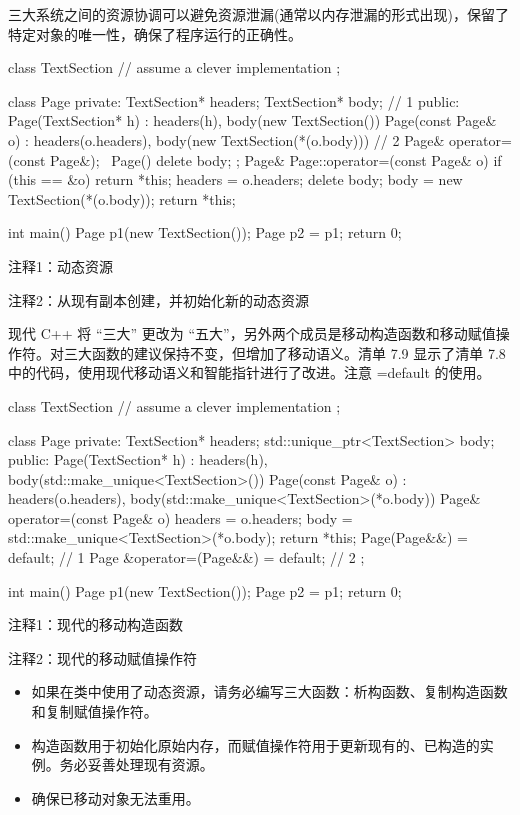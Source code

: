 三大系统之间的资源协调可以避免资源泄漏(通常以内存泄漏的形式出现)，保留了特定对象的唯一性，确保了程序运行的正确性。


\begin{cpp}
class TextSection {
  // assume a clever implementation
};

class Page {
private:
  TextSection* headers;
  TextSection* body;
// 1
public:
  Page(TextSection* h) : headers(h), body(new TextSection()) {}
  Page(const Page& o) : headers(o.headers), body(new TextSection(*(o.body))) {}
// 2
  Page& operator=(const Page&);
  ~Page() { delete body; }
};
Page& Page::operator=(const Page& o) {
  if (this == &o)
    return *this;
  headers = o.headers;
  delete body;
  body = new TextSection(*(o.body));
  return *this;
}

int main() {
  Page p1(new TextSection());
  Page p2 = p1;
  return 0;
}
\end{cpp}

{\footnotesize
注释1：动态资源

注释2：从现有副本创建，并初始化新的动态资源
}

现代 C++ 将 “三大” 更改为 “五大”，另外两个成员是移动构造函数和移动赋值操作符。对三大函数的建议保持不变，但增加了移动语义。清单 7.9 显示了清单 7.8 中的代码，使用现代移动语义和智能指针进行了改进。注意 =default 的使用。


\begin{cpp}
class TextSection {
  // assume a clever implementation
};

class Page {
private:
  TextSection* headers;
  std::unique_ptr<TextSection> body;
public:
  Page(TextSection* h) : headers(h),
  body(std::make_unique<TextSection>()) {}
  Page(const Page& o) : headers(o.headers),
  body(std::make_unique<TextSection>(*o.body)) {}
  Page& operator=(const Page& o) {
    headers = o.headers;
    body = std::make_unique<TextSection>(*o.body);
    return *this;
  }
  Page(Page&&) = default; // 1
  Page &operator=(Page&&) = default; // 2
};

int main() {
  Page p1(new TextSection());
  Page p2 = p1;
  return 0;
}
\end{cpp}

{\footnotesize
注释1：现代的移动构造函数

注释2：现代的移动赋值操作符
}


\begin{itemize}
\item
如果在类中使用了动态资源，请务必编写三大函数：析构函数、复制构造函数和复制赋值操作符。

\item
构造函数用于初始化原始内存，而赋值操作符用于更新现有的、已构造的实例。务必妥善处理现有资源。

\item
确保已移动对象无法重用。
\end{itemize}


















